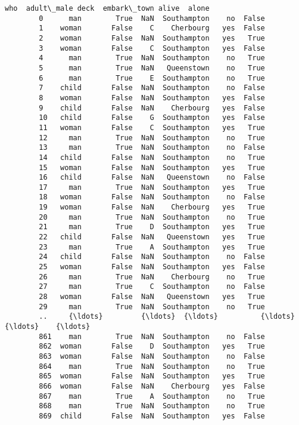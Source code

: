 \documentclass[11pt]{article}
\begin{document}
\begin{Verbatim}[commandchars=\\\{\}]
               who  adult\_male deck  embark\_town alive  alone  
        0      man        True  NaN  Southampton    no  False  
        1    woman       False    C    Cherbourg   yes  False  
        2    woman       False  NaN  Southampton   yes   True  
        3    woman       False    C  Southampton   yes  False  
        4      man        True  NaN  Southampton    no   True  
        5      man        True  NaN   Queenstown    no   True  
        6      man        True    E  Southampton    no   True  
        7    child       False  NaN  Southampton    no  False  
        8    woman       False  NaN  Southampton   yes  False  
        9    child       False  NaN    Cherbourg   yes  False  
        10   child       False    G  Southampton   yes  False  
        11   woman       False    C  Southampton   yes   True  
        12     man        True  NaN  Southampton    no   True  
        13     man        True  NaN  Southampton    no  False  
        14   child       False  NaN  Southampton    no   True  
        15   woman       False  NaN  Southampton   yes   True  
        16   child       False  NaN   Queenstown    no  False  
        17     man        True  NaN  Southampton   yes   True  
        18   woman       False  NaN  Southampton    no  False  
        19   woman       False  NaN    Cherbourg   yes   True  
        20     man        True  NaN  Southampton    no   True  
        21     man        True    D  Southampton   yes   True  
        22   child       False  NaN   Queenstown   yes   True  
        23     man        True    A  Southampton   yes   True  
        24   child       False  NaN  Southampton    no  False  
        25   woman       False  NaN  Southampton   yes  False  
        26     man        True  NaN    Cherbourg    no   True  
        27     man        True    C  Southampton    no  False  
        28   woman       False  NaN   Queenstown   yes   True  
        29     man        True  NaN  Southampton    no   True  
        ..     {\ldots}         {\ldots}  {\ldots}          {\ldots}   {\ldots}    {\ldots}  
        861    man        True  NaN  Southampton    no  False  
        862  woman       False    D  Southampton   yes   True  
        863  woman       False  NaN  Southampton    no  False  
        864    man        True  NaN  Southampton    no   True  
        865  woman       False  NaN  Southampton   yes   True  
        866  woman       False  NaN    Cherbourg   yes  False  
        867    man        True    A  Southampton    no   True  
        868    man        True  NaN  Southampton    no   True  
        869  child       False  NaN  Southampton   yes  False  

\end{Verbatim}
\end{document}
